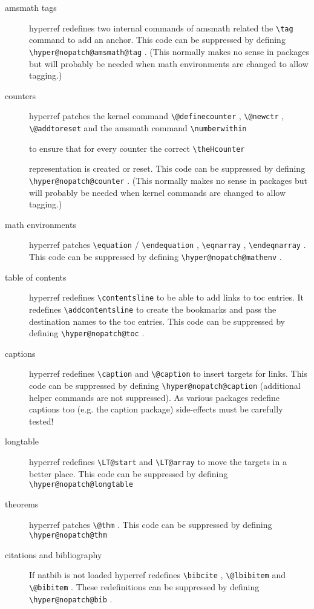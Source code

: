 \documentclass{article}
\newcommand*{\cs}[1]{%
  \texttt{\textbackslash #1}%
}
\newcommand*{\xpackage}[1]{\textsf{#1}}
\begin{document}
\begin{description}
\item[amsmath tags] \xpackage{hyperref} redefines two internal commands of amsmath 
    related the \cs{tag} command to add an anchor. This code can be 
    suppressed by defining \cs{hyper@nopatch@amsmath@tag}. (This normally 
    makes no sense in packages but will probably be needed when math 
    environments are changed to allow tagging.) 
   
\item[counters] \xpackage{hyperref} patches the kernel command \cs{@definecounter}, 
    \cs{@newctr}, \cs{@addtoreset} and the amsmath command \cs{numberwithin} 
    to ensure that for every counter the correct \cs{theHcounter} 
    representation is created or reset. This code can be suppressed by 
    defining \cs{hyper@nopatch@counter}. (This normally makes no sense in 
    packages but will probably be needed when kernel commands are changed 
    to allow tagging.)  
    
\item[math environments] \xpackage{hyperref} patches \cs{equation}/\cs{endequation}, \cs{eqnarray},    
    \cs{endeqnarray}. This code can be suppressed by 
    defining \cs{hyper@nopatch@mathenv}. 
    
\item[table of contents] \xpackage{hyperref} redefines \cs{contentsline} to be able to add links to
toc entries. It redefines \cs{addcontentsline} to create the bookmarks and pass the 
destination names to the toc entries. This code can be suppressed by defining \cs{hyper@nopatch@toc}.  

\item[captions] \xpackage{hyperref} redefines \cs{caption} and \cs{@caption} to insert targets for links.
This code can be suppressed by defining \cs{hyper@nopatch@caption} (additional helper commands are
not suppressed). As various packages redefine captions too (e.g. the \xpackage{caption} package)
side-effects must be carefully tested! 
 
\item[longtable] \xpackage{hyperref} redefines \cs{LT@start} and \cs{LT@array} to move the targets in a better place.
This code can be suppressed by defining \cs{hyper@nopatch@longtable}  

\item[theorems] \xpackage{hyperref} patches \cs{@thm}. This code can be suppressed by defining \cs{hyper@nopatch@thm}  

\item[citations and bibliography] If \xpackage{natbib} is not loaded \xpackage{hyperref} redefines \cs{bibcite},
\cs{@lbibitem}  and \cs{@bibitem}. These redefinitions can be suppressed by defining \cs{hyper@nopatch@bib}.
\end{description}
\end{document}
